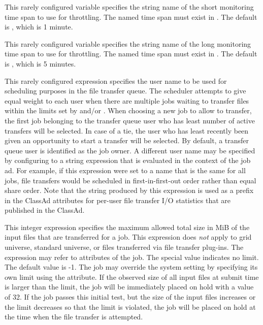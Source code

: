 \begin{description}
\label{param:FileTransferDiskLoadThrottleShortHorizon}
\item[\Macro{FILE\_TRANSFER\_DISK\_LOAD\_THROTTLE\_SHORT\_HORIZON}]
  This rarely configured variable specifies the string name of the short
  monitoring time span to use for throttling.  The named time span must
  exist in .  The default is
  , which is 1 minute.

\label{param:FileTransferDiskLoadThrottleLongHorizon}
\item[\Macro{FILE\_TRANSFER\_DISK\_LOAD\_THROTTLE\_LONG\_HORIZON}]
  This rarely configured variable specifies the string name of the long
  monitoring time span to use for throttling.  The named time span must
  exist in .  The default is
  , which is 5 minutes.

\label{param:TransferQueueUserExpr}
\item[\Macro{TRANSFER\_QUEUE\_USER\_EXPR}]
  This rarely configured expression specifies the user name to be used
  for scheduling purposes in the file transfer queue.  The scheduler
  attempts to give equal weight to each user when there are multiple
  jobs waiting to transfer files within the limits set by
   and/or
  .  When choosing a new job to
  allow to transfer, the first job belonging to the transfer queue
  user who has least number of active transfers will be selected.
  In case of a tie, the user who has least recently been given an
  opportunity to start a transfer will be selected.  By default, a
  transfer queue user is identified as the job owner.  A different
  user name may be specified by configuring
   to a string expression that is
  evaluated in the context of the job ad.  For example, if this
  expression were set to a name that is the same for all jobs, file
  transfers would be scheduled in first-in-first-out order rather than
  equal share order.  Note that the string produced by this expression
  is used as a prefix in the ClassAd attributes for per-user file
  transfer I/O statistics that are published in the 
  ClassAd.

\label{param:MaxTransferInputMB}
\item[\Macro{MAX\_TRANSFER\_INPUT\_MB}]
  This integer expression specifies the maximum allowed total size in
  MiB of the input files that are transferred for a job.  This
  expression does \emph{not} apply to grid universe, standard universe, or
  files transferred via file transfer plug-ins.  The expression may
  refer to attributes of the job.  
  The special value  indicates no limit.
  The default value is -1.
  The job may override the system setting
  by specifying its own limit using the 
  attribute.  
  If the observed size of all input files at submit time
  is larger than the limit, the job will be immediately placed on hold
  with a  value of 32.
  If the job passes this initial test, but the
  size of the input files increases or the limit decreases so that the
  limit is violated, the job will be placed on hold at the time when
  the file transfer is attempted.


\end{description}
